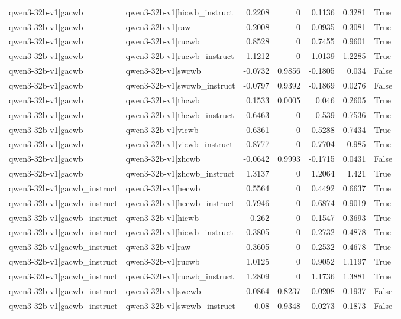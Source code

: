\begin{table}
\begin{tabular}{l l r r r r l}
qwen3-32b-v1|gacwb & qwen3-32b-v1|hicwb_instruct & 0.2208 & 0 & 0.1136 & 0.3281 & True \\
qwen3-32b-v1|gacwb & qwen3-32b-v1|raw & 0.2008 & 0 & 0.0935 & 0.3081 & True \\
qwen3-32b-v1|gacwb & qwen3-32b-v1|rucwb & 0.8528 & 0 & 0.7455 & 0.9601 & True \\
qwen3-32b-v1|gacwb & qwen3-32b-v1|rucwb_instruct & 1.1212 & 0 & 1.0139 & 1.2285 & True \\
qwen3-32b-v1|gacwb & qwen3-32b-v1|swcwb & -0.0732 & 0.9856 & -0.1805 & 0.034 & False \\
qwen3-32b-v1|gacwb & qwen3-32b-v1|swcwb_instruct & -0.0797 & 0.9392 & -0.1869 & 0.0276 & False \\
qwen3-32b-v1|gacwb & qwen3-32b-v1|thcwb & 0.1533 & 0.0005 & 0.046 & 0.2605 & True \\
qwen3-32b-v1|gacwb & qwen3-32b-v1|thcwb_instruct & 0.6463 & 0 & 0.539 & 0.7536 & True \\
qwen3-32b-v1|gacwb & qwen3-32b-v1|vicwb & 0.6361 & 0 & 0.5288 & 0.7434 & True \\
qwen3-32b-v1|gacwb & qwen3-32b-v1|vicwb_instruct & 0.8777 & 0 & 0.7704 & 0.985 & True \\
qwen3-32b-v1|gacwb & qwen3-32b-v1|zhcwb & -0.0642 & 0.9993 & -0.1715 & 0.0431 & False \\
qwen3-32b-v1|gacwb & qwen3-32b-v1|zhcwb_instruct & 1.3137 & 0 & 1.2064 & 1.421 & True \\
qwen3-32b-v1|gacwb_instruct & qwen3-32b-v1|hecwb & 0.5564 & 0 & 0.4492 & 0.6637 & True \\
qwen3-32b-v1|gacwb_instruct & qwen3-32b-v1|hecwb_instruct & 0.7946 & 0 & 0.6874 & 0.9019 & True \\
qwen3-32b-v1|gacwb_instruct & qwen3-32b-v1|hicwb & 0.262 & 0 & 0.1547 & 0.3693 & True \\
qwen3-32b-v1|gacwb_instruct & qwen3-32b-v1|hicwb_instruct & 0.3805 & 0 & 0.2732 & 0.4878 & True \\
qwen3-32b-v1|gacwb_instruct & qwen3-32b-v1|raw & 0.3605 & 0 & 0.2532 & 0.4678 & True \\
qwen3-32b-v1|gacwb_instruct & qwen3-32b-v1|rucwb & 1.0125 & 0 & 0.9052 & 1.1197 & True \\
qwen3-32b-v1|gacwb_instruct & qwen3-32b-v1|rucwb_instruct & 1.2809 & 0 & 1.1736 & 1.3881 & True \\
qwen3-32b-v1|gacwb_instruct & qwen3-32b-v1|swcwb & 0.0864 & 0.8237 & -0.0208 & 0.1937 & False \\
qwen3-32b-v1|gacwb_instruct & qwen3-32b-v1|swcwb_instruct & 0.08 & 0.9348 & -0.0273 & 0.1873 & False \\

\end{tabular}
\end{table}
